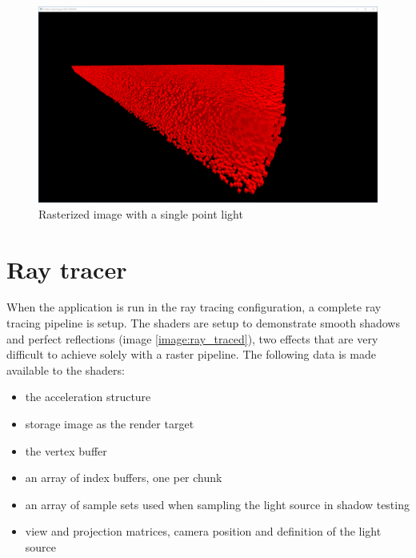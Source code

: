 \documentclass[times, utf8, zavrsni, numeric]{fer}
\begin{document}
\begin{center}
\begin{figure}[H]
\includegraphics[width=1\textwidth]{raster.png}
\caption{Rasterized image with a single point light}
\label{image:raster}
\end{figure}
\end{center}

\section{Ray tracer}
When the application is run in the ray tracing configuration, a complete ray tracing pipeline is setup. The shaders are setup to demonstrate smooth shadows and perfect reflections (image \ref{image:ray_traced}), two effects that are very difficult to achieve solely with a raster pipeline. The following data is made available to the shaders:
\begin{itemize}
	\item{the acceleration structure}
	\item{storage image as the render target}
	\item{the vertex buffer}
	\item{an array of index buffers, one per chunk}
	\item{an array of sample sets used when sampling the light source in shadow testing}
	\item{view and projection matrices, camera position and definition of the light source}
\end{itemize}
\end{document}
